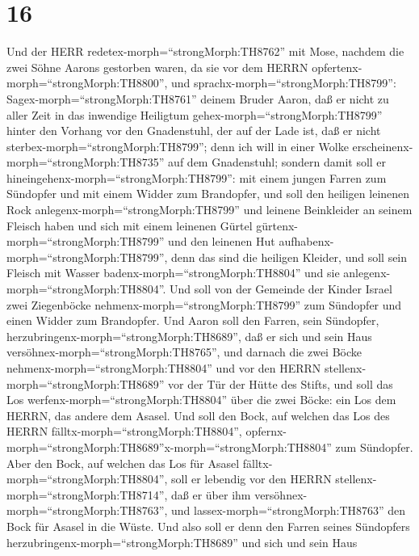 \hypertarget{section-15}{%
\section{16}\label{section-15}}

 Und der HERR redetex-morph=``strongMorph:TH8762'' mit Mose,
nachdem die zwei Söhne Aarons gestorben waren, da sie vor dem HERRN
opfertenx-morph=``strongMorph:TH8800'',  und
sprachx-morph=``strongMorph:TH8799'': Sagex-morph=``strongMorph:TH8761''
deinem Bruder Aaron, daß er nicht zu aller Zeit in das inwendige
Heiligtum gehex-morph=``strongMorph:TH8799'' hinter den Vorhang vor den
Gnadenstuhl, der auf der Lade ist, daß er nicht
sterbex-morph=``strongMorph:TH8799''; denn ich will in einer Wolke
erscheinenx-morph=``strongMorph:TH8735'' auf dem Gnadenstuhl;
 sondern damit soll er
hineingehenx-morph=``strongMorph:TH8799'': mit einem jungen Farren zum
Sündopfer und mit einem Widder zum Brandopfer,  und soll den
heiligen leinenen Rock anlegenx-morph=``strongMorph:TH8799'' und leinene
Beinkleider an seinem Fleisch haben und sich mit einem leinenen Gürtel
gürtenx-morph=``strongMorph:TH8799'' und den leinenen Hut
aufhabenx-morph=``strongMorph:TH8799'', denn das sind die heiligen
Kleider, und soll sein Fleisch mit Wasser
badenx-morph=``strongMorph:TH8804'' und sie
anlegenx-morph=``strongMorph:TH8804''.  Und soll von der
Gemeinde der Kinder Israel zwei Ziegenböcke
nehmenx-morph=``strongMorph:TH8799'' zum Sündopfer und einen Widder zum
Brandopfer.  Und Aaron soll den Farren, sein Sündopfer,
herzubringenx-morph=``strongMorph:TH8689'', daß er sich und sein Haus
versöhnex-morph=``strongMorph:TH8765'',  und darnach die
zwei Böcke nehmenx-morph=``strongMorph:TH8804'' und vor den HERRN
stellenx-morph=``strongMorph:TH8689'' vor der Tür der Hütte des Stifts,
 und soll das Los werfenx-morph=``strongMorph:TH8804'' über
die zwei Böcke: ein Los dem HERRN, das andere dem Asasel. 
Und soll den Bock, auf welchen das Los des HERRN
fälltx-morph=``strongMorph:TH8804'',
opfernx-morph=``strongMorph:TH8689''x-morph=``strongMorph:TH8804'' zum
Sündopfer.  Aber den Bock, auf welchen das Los für Asasel
fälltx-morph=``strongMorph:TH8804'', soll er lebendig vor den HERRN
stellenx-morph=``strongMorph:TH8714'', daß er über ihm
versöhnex-morph=``strongMorph:TH8763'', und
lassex-morph=``strongMorph:TH8763'' den Bock für Asasel in die Wüste.
 Und also soll er denn den Farren seines Sündopfers
herzubringenx-morph=``strongMorph:TH8689'' und sich und sein Haus
